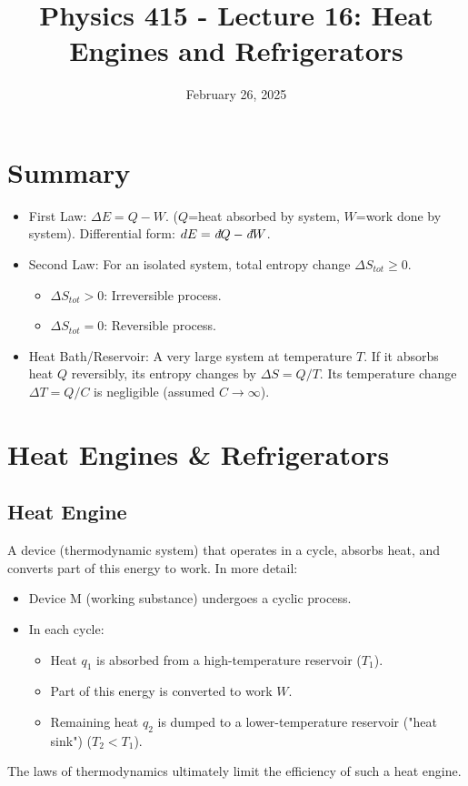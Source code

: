 \documentclass[11pt]{article}
\title{Physics 415 - Lecture 16: Heat Engines and Refrigerators}
\date{February 26, 2025}
\author{} %
\newcommand{\ethbar}{\text{\it{đ}}} %
\begin{document}
\maketitle
\thispagestyle{empty}

\section*{Summary}

\begin{itemize}
    \item First Law: $\Delta E = Q - W$. ($Q$=heat absorbed by system, $W$=work done by system). Differential form: $dE = \ethbar Q - \ethbar W$.
    \item Second Law: For an isolated system, total entropy change $\Delta S_{tot} \ge 0$.
        \begin{itemize}
            \item $\Delta S_{tot} > 0$: Irreversible process.
            \item $\Delta S_{tot} = 0$: Reversible process.
        \end{itemize}
    \item Heat Bath/Reservoir: A very large system at temperature $T$. If it absorbs heat $Q$ reversibly, its entropy changes by $\Delta S = Q/T$. Its temperature change $\Delta T = Q/C$ is negligible (assumed $C \to \infty$).
\end{itemize}

\section*{Heat Engines \& Refrigerators}

\subsection*{Heat Engine}
A device (thermodynamic system) that operates in a cycle, absorbs heat, and converts part of this energy to work.
In more detail:
\begin{itemize}
    \item Device M (working substance) undergoes a cyclic process.
    \item In each cycle:
        \begin{itemize}
            \item Heat $q_1$ is absorbed from a high-temperature reservoir ($T_1$).
            \item Part of this energy is converted to work $W$.
            \item Remaining heat $q_2$ is dumped to a lower-temperature reservoir ("heat sink") ($T_2 < T_1$).
        \end{itemize}
\end{itemize}
The laws of thermodynamics ultimately limit the efficiency of such a heat engine.
\end{document}
